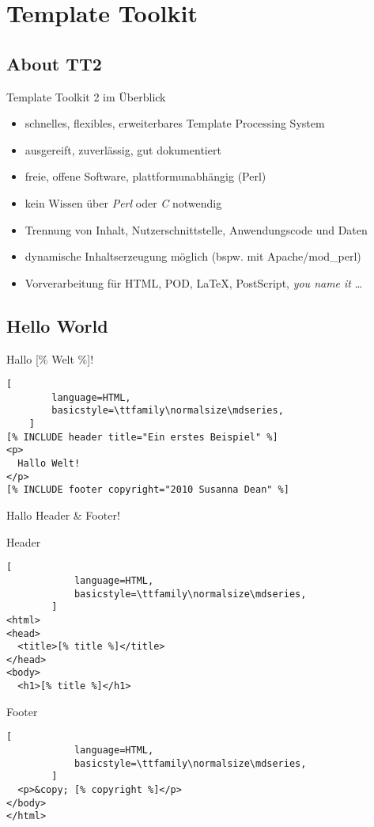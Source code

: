 \documentclass{beamer}
\begin{document}
\section{Template Toolkit}

\subsection{About TT2}

\begin{frame}{Template Toolkit 2 im Überblick}
    \begin{itemize}
        \item schnelles, flexibles, erweiterbares Template Processing
            System
        \item ausgereift, zuverlässig, gut dokumentiert
        \pause
        \item freie, offene Software, plattformunabhängig (Perl)
        \item kein Wissen über \emph{Perl} oder \emph{C} notwendig
        \pause
        \item Trennung von Inhalt, Nutzerschnittstelle, Anwendungscode
            und Daten
        \item dynamische Inhaltserzeugung möglich (bspw. mit
            Apache/mod\_perl)
        \pause
        \item Vorverarbeitung für HTML, POD, \LaTeX, PostScript,
            \emph{you name it} \dots
    \end{itemize}
\end{frame}

\subsection{Hello World}

\begin{frame}[fragile]{Hallo [\% Welt \%]!}
    \begin{lstlisting}[
        language=HTML,
        basicstyle=\ttfamily\normalsize\mdseries,
    ]
[% INCLUDE header title="Ein erstes Beispiel" %]
<p>
  Hallo Welt!
</p>
[% INCLUDE footer copyright="2010 Susanna Dean" %]
    \end{lstlisting} 
\end{frame}

\begin{frame}[fragile]{Hallo Header \& Footer!}
    \begin{block}{Header}
        \begin{lstlisting}[
            language=HTML,
            basicstyle=\ttfamily\normalsize\mdseries,
        ]
<html>
<head>
  <title>[% title %]</title>
</head>
<body>
  <h1>[% title %]</h1>
        \end{lstlisting}
    \end{block}
    \pause
    \begin{block}{Footer}
        \begin{lstlisting}[
            language=HTML,
            basicstyle=\ttfamily\normalsize\mdseries,
        ]
  <p>&copy; [% copyright %]</p>
</body>
</html>
        \end{lstlisting}
    \end{block}
\end{frame}
\end{document}
